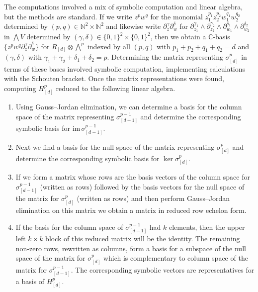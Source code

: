 \documentclass[pdftex]{sigma}
\numberwithin{equation}{section}
\begin{document}
The computations involved a mix of symbolic computation and linear algebra, but the methods are standard. If we write $z^pw^q$ for the monomial $z_1^{p_1}z_2^{p_2}w_1^{q_1}w_2^{q_2}$ determined by $(p,q)\in \mathbb N^2\times \mathbb N^2$ and likewise write $\partial_{z}^\gamma\partial_{w}^\delta$ for $\partial_{z_1}^{\gamma_1}\wedge\partial_{z_2}^{\gamma_2}\wedge\partial_{w_1}^{\delta_1}\wedge\partial_{w_2}^{\delta_2}$ in $\bigwedge V$ determined by $(\gamma,\delta)\in \{0,1\}^2\times\{0,1\}^2$, then we obtain a ${\mathbb C}$-basis $\{z^p w^q \partial_{z}^\gamma \partial_{w}^\delta\}$ for $R_{[d]}\otimes \bigwedge^p$ indexed by all $(p,q)$ with $p_1+p_2+q_1+q_2=d$ and $(\gamma,\delta)$ with $\gamma_1+\gamma_2+\delta_1+\delta_2=p$. Determining the matrix representing $\sigma^p_{[d]}$ in terms of these bases involved symbolic computation, implementing calculations with the Schouten bracket. Once the matrix representations were found, computing $H^p_{[d]}$ reduced to the following linear algebra.
\begin{enumerate}\itemsep=0pt
\item Using Gauss--Jordan elimination, we can determine a basis for the column space of the matrix representing $\sigma^{p-1}_{[d-1]}$ and determine the corresponding symbolic basis for $\mathrm{im}\,\sigma^{p-1}_{[d-1]}$.
\item Next we f\/ind a basis for the null space of the matrix representing $\sigma^p_{[d]}$ and determine the corresponding symbolic basis for $\ker\sigma_{[d]}^p$.
\item If we form a matrix whose rows are the basis vectors of the column space for $\sigma_{[d-1]}^{p-1}$ (written as rows) followed by the basis vectors for the null space of the matrix for $\sigma^p_{[d]}$ (written as rows) and then perform Gauss--Jordan elimination on this matrix we obtain a matrix in reduced row echelon form.
\item If the basis for the column space of $\sigma_{[d-1]}^{p-1}$ had $k$ elements, then the upper left $k\times k$ block of this reduced matrix will be the identity. The remaining non-zero rows, rewritten as columns, form a basis for a subspace of the null space of the matrix for $\sigma^p_{[d]}$ which is complementary to column space of the matrix for $\sigma^{p-1}_{[d-1]}$. The corresponding symbolic vectors are representatives for a basis of $H^p_{[d]}$.
\end{enumerate}
\end{document}
